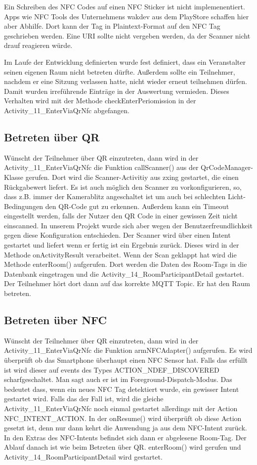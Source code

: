 Ein Schreiben des NFC Codes auf einen NFC Sticker ist nicht implemenentiert.
 Apps wie NFC Tools des Unternehmens wakdev aus dem PlayStore schaffen hier aber Abhilfe. Dort kann der Tag in Plaintext-Format auf den NFC Tag geschrieben werden.
Eine URI sollte nicht vergeben werden, da der Scanner nicht drauf reagieren würde.

Im Laufe der Entwicklung definierten wurde fest definiert, dass ein Veranstalter seinen eigenen Raum nicht betreten dürfte.
 Außerdem sollte ein Teilnehmer, nachdem er eine Sitzung verlassen hatte, nicht wieder erneut teilnehmen dürfen. 
 Damit wurden irreführende Einträge in der Auswertung vermieden. Dieses Verhalten wird mit der Methode checkEnterPeriomission in der Activity\_11\_EnterViaQrNfc abgefangen.
\subsection{Betreten über QR}
\label{subsec: Betreten über QR}
Wünscht der Teilnehmer über QR einzutreten, dann wird in der Activity\_11\_EnterViaQrNfc die Funktion callScanner() aus der QrCodeManager-Klasse gerufen. Dort wird die Scanner-Activitiy aus zxing gestartet, die einen Rückgabewert liefert. Es ist auch möglich den Scanner zu vorkonfigurieren, so, dass z.B. immer der Kamerablitz angeschaltet ist um auch bei schlechten Licht-Bedingungen den QR-Code gut zu erkennen. 
Außerdem kann ein Timeout eingestellt werden, falls der Nutzer den QR Code in einer gewissen Zeit nicht einscanned.
In unserem Projekt wurde sich aber wegen der Benutzerfreundlichkeit gegen diese Konfiguration entschieden.
Der Scanner wird über einen Intent gestartet und liefert wenn er fertig ist ein Ergebnis zurück.
Dieses wird in der Methode onActivityResult verarbeitet. Wenn der Scan geklappt hat wird die Methode enterRoom() aufgerufen. Dort werden die Daten des Room-Tags in die Datenbank eingetragen und die Activity\_14\_RoomParticipantDetail gestartet. Der Teilnehmer hört dort dann auf das korrekte MQTT Topic. Er hat den Raum betreten.
\subsection{Betreten über NFC}
\label{subsec: Betreten über NFC}
Wünscht der Teilnehmer über QR einzutreten, dann wird in der Activity\_11\_EnterViaQrNfc die Funktion armNFCAdapter() aufgerufen. Es wird überprüft ob das Smartphone überhaupt einen NFC Sensor hat.
Falls das erfüllt ist wird dieser auf events des Types ACTION\_NDEF\_DISCOVERED scharfgeschaltet. 
Man sagt auch er ist im Foreground-Dispatch-Modus.
Das bedeutet dass, wenn ein neues NFC Tag detektiert wurde, ein gewisser Intent gestartet wird. 
Falls das der Fall ist, wird die gleiche Activity\_11\_EnterViaQrNfc noch einmal gestartet allerdings mit der Action NFC\_INTENT\_ACTION. 
In der onResume() wird überprüft ob diese Action gesetzt ist, denn nur dann kehrt die Anwendung ja aus dem NFC-Intent zurück. 
In den Extras des NFC-Intents befindet sich dann er abgelesene Room-Tag. Der Ablauf danach ist wie beim Betreten über QR. enterRoom() wird gerufen und Activity\_14\_RoomParticipantDetail wird gestartet.
